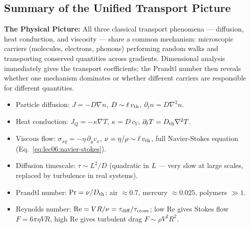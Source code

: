 \subsection{Summary of the Unified Transport Picture}
\label{sec:lec06:summary}

\textbf{The Physical Picture:}
All three classical transport phenomena — diffusion, heat conduction, and
viscosity — share a common mechanism: microscopic carriers (molecules,
electrons, phonons) performing random walks and transporting conserved
quantities across gradients. Dimensional analysis immediately gives the
transport coefficients; the Prandtl number then reveals whether one mechanism
dominates or whether different carriers are responsible for different
quantities.

\begin{itemize}
    \item Particle diffusion: $J = -D\nabla n$, \quad $D \sim \ell\,v_{\rm th}$,
    \quad $\partial_t n = D\nabla^2 n$.
    \item Heat conduction: $J_Q = -\kappa\nabla T$, \quad
    $\kappa = D\,c_V$, \quad $\partial_t T = D_{\rm th}\nabla^2 T$.
    \item Viscous flow: $\sigma_{xy} = -\eta\,\partial_y v_x$, \quad
    $\nu = \eta/\rho \sim \ell\,v_{\rm th}$, \quad full Navier-Stokes
    equation (Eq.~\eqref{eq:lec06:navier-stokes}).
    \item Diffusion timescale: $\tau \sim L^2/D$ (quadratic in $L$ — very slow
    at large scales, replaced by turbulence in real systems).
    \item Prandtl number: $\mathrm{Pr} = \nu/D_{\rm th}$; air $\approx 0.7$,
    mercury $\approx 0.025$, polymers $\gg 1$.
    \item Reynolds number: $\mathrm{Re} = VR/\nu = \tau_{\rm diff}/\tau_{\rm
    cross}$; low Re gives Stokes flow $F = 6\pi\eta VR$, high Re gives
    turbulent drag $F \sim \rho V^2 R^2$.
\end{itemize}
